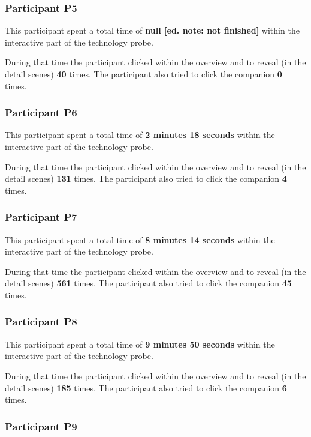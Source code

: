 \begin{appendices}
  \subsubsection*{Participant P5}

  This participant spent a total time of \textbf{null [ed. note: not finished]} within the interactive part of the technology probe.

  During that time the participant clicked within the overview and to reveal (in the detail scenes) \textbf{40} times. The participant also tried to click the companion \textbf{0} times.


  \subsubsection*{Participant P6}

  This participant spent a total time of \textbf{2 minutes 18 seconds} within the interactive part of the technology probe.

  During that time the participant clicked within the overview and to reveal (in the detail scenes) \textbf{131} times. The participant also tried to click the companion \textbf{4} times.


  \subsubsection*{Participant P7}

  This participant spent a total time of \textbf{8 minutes 14 seconds} within the interactive part of the technology probe.

  During that time the participant clicked within the overview and to reveal (in the detail scenes) \textbf{561} times. The participant also tried to click the companion \textbf{45} times.


  \subsubsection*{Participant P8}

  This participant spent a total time of \textbf{9 minutes 50 seconds} within the interactive part of the technology probe.

  During that time the participant clicked within the overview and to reveal (in the detail scenes) \textbf{185} times. The participant also tried to click the companion \textbf{6} times.


  \subsubsection*{Participant P9}


\end{appendices}

